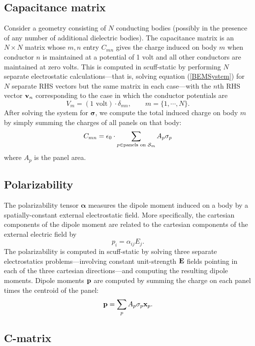 \documentclass[letterpaper]{article}
\newcommand{\vbsigma}{\boldsymbol{\sigma}}
\begin{document}
\subsection{Capacitance matrix}

Consider a geometry consisting of $N$ conducting bodies
(possibly in the presence of any number of additional
dielectric bodies). The capacitance matrix is an $N\times N$
matrix whose $m,n$ entry $C_{mn}$ gives the charge 
induced on body $m$ when conductor $n$ is maintained at 
a potential of 1 volt and all other conductors are maintained
at zero volts. This is computed in {\sc scuff-static}
by performing $N$ separate electrostatic calculations---that 
is, solving equation (\ref{BEMSystem}) for $N$ separate RHS 
vectors but the same matrix in each case---with the 
$n$th RHS vector $\mathbf{v}_n$ corresponding to the case 
in which the conductor potentials are 
$$V_m = (1\text{ volt})\cdot \delta_{mn}, \qquad 
  m=\{1,\cdots,N\}.$$
After solving the system for $\vbsigma$,
we compute the total induced charge on body $m$ by 
simply summing the charges of all panels on that body:
$$ C_{mn} 
   = 
   \epsilon_0 \cdot \sum_{p\in \text{panels on $\mathcal{S}_m$}} A_p \sigma_p 
$$
where $A_p$ is the panel area.

\subsection{Polarizability}

The polarizability tensor $\boldsymbol{\alpha}$ measures the dipole
moment induced on a body by a spatially-constant external electrostatic
field. More specifically, the cartesian components of the dipole moment
are related to the cartesian components of the external electric field by
$$ p_i =\alpha_{ij} E_j.$$
The polarizability is computed in {\sc scuff-static} by solving
three separate electrostatics problems---involving constant unit-strength
$\mathbf{E}$ fields pointing in each of the three cartesian directions---and
computing the resulting dipole moments.
Dipole moments $\mathbf{p}$ are computed by summing
the charge on each panel times the centroid of 
the panel:
$$ \mathbf{p} = \sum_{p} A_p \sigma_p \mathbf{x}_p.$$

\subsection{C-matrix}
\end{document}
